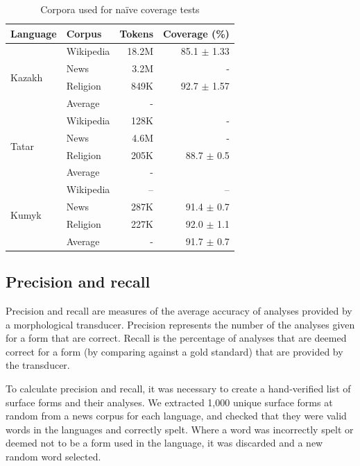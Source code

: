 \documentclass[a4paper,11pt,twocolumn]{article}
\begin{document}
\begin{table}
\begin{center}
\begin{tabular}{llrr}
\toprule
\textbf{Language} & \textbf{Corpus} & \textbf{Tokens} & \textbf{Coverage} (\%) \\
\midrule
\multirow{4}{*}{Kazakh} & Wikipedia & 18.2M &  85.1 $\pm$ 1.33 \\
	& News & 3.2M & - \\
	& Religion & 849K & 92.7 $\pm$ 1.57 \\\cline{2-4}
	& Average & - &  \\
\midrule
\multirow{4}{*}{Tatar} & Wikipedia & 128K &  - \\
	& News & 4.6M & - \\
	& Religion & 205K & 88.7 $\pm$ 0.5 \\\cline{2-4}
	& Average & - &  \\
\midrule
\multirow{4}{*}{Kumyk} & Wikipedia & -- & -- \\
        & News & 287K &  91.4 $\pm$ 0.7 \\
	& Religion & 227K & 92.0 $\pm$ 1.1 \\\cline{2-4}
	& Average & - & 91.7 $\pm$ 0.7 \\
\bottomrule
\end{tabular}
 \caption{Corpora used for naïve coverage tests}
 \label{table:corpora}
\end{center}
\end{table}

\subsection{Precision and recall}

Precision and recall are measures of the average accuracy of analyses provided by a morphological transducer.  Precision represents the number of the analyses given for a form that are correct.  Recall is the percentage of analyses that are deemed correct for a form (by comparing against a gold standard) that are provided by the transducer.

To calculate precision and recall, it was necessary to create a hand-verified list of surface forms and their analyses.  We extracted 1,000 unique surface forms at random from a news corpus for each language, and checked that they were valid words in the languages and correctly spelt.  Where a word was incorrectly spelt or deemed not to be a form used in the language, it was discarded and a new random word selected.
\end{document}
